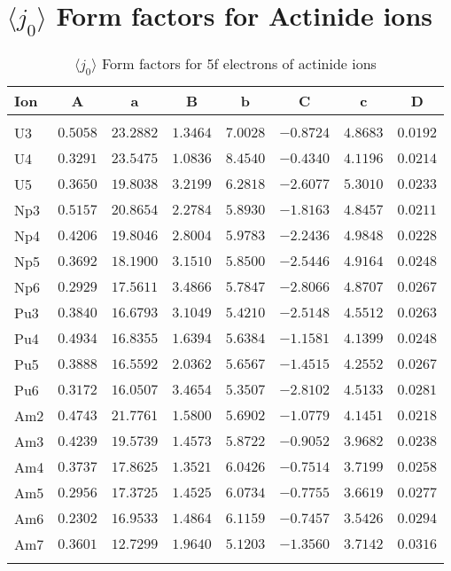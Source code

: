 \section{{\large$\langle j_0\rangle$ }Form factors for Actinide ions}
\begin{table}[H]
\caption{$\langle j_0\rangle$ Form factors for 5f electrons of actinide ions}\vspace{2mm}
\label{acj0}
{\tablesize
\begin{tabular}{lrrrrrrr}
\hline
Ion&
\multicolumn{1}{c}{A}&\multicolumn{1}{c}{a}&
\multicolumn{1}{c}{B}&\multicolumn{1}{c}{b}&
\multicolumn{1}{c}{C}&\multicolumn{1}{c}{c}&\multicolumn{1}{c}{D}\\
\hline\\[-2ex]
U3 &$0.5058$ &$23.2882$ &$1.3464$ &$7.0028$ &$-0.8724$ &$4.8683$ &$0.0192$ \\
U4 &$0.3291$ &$23.5475$ &$1.0836$ &$8.4540$ &$-0.4340$ &$4.1196$ &$0.0214$ \\
U5 &$0.3650$ &$19.8038$ &$3.2199$ &$6.2818$ &$-2.6077$ &$5.3010$ &$0.0233$ \\
Np3 &$0.5157$ &$20.8654$ &$2.2784$ &$5.8930$ &$-1.8163$ &$4.8457$ &$0.0211$ \\
Np4 &$0.4206$ &$19.8046$ &$2.8004$ &$5.9783$ &$-2.2436$ &$4.9848$ &$0.0228$ \\
Np5 &$0.3692$ &$18.1900$ &$3.1510$ &$5.8500$ &$-2.5446$ &$4.9164$ &$0.0248$ \\
Np6 &$0.2929$ &$17.5611$ &$3.4866$ &$5.7847$ &$-2.8066$ &$4.8707$ &$0.0267$ \\
Pu3 &$0.3840$ &$16.6793$ &$3.1049$ &$5.4210$ &$-2.5148$ &$4.5512$ &$0.0263$ \\
Pu4 &$0.4934$ &$16.8355$ &$1.6394$ &$5.6384$ &$-1.1581$ &$4.1399$ &$0.0248$ \\
Pu5 &$0.3888$ &$16.5592$ &$2.0362$ &$5.6567$ &$-1.4515$ &$4.2552$ &$0.0267$ \\
Pu6 &$0.3172$ &$16.0507$ &$3.4654$ &$5.3507$ &$-2.8102$ &$4.5133$ &$0.0281$ \\
Am2 &$0.4743$ &$21.7761$ &$1.5800$ &$5.6902$ &$-1.0779$ &$4.1451$ &$0.0218$ \\
Am3 &$0.4239$ &$19.5739$ &$1.4573$ &$5.8722$ &$-0.9052$ &$3.9682$ &$0.0238$ \\
Am4 &$0.3737$ &$17.8625$ &$1.3521$ &$6.0426$ &$-0.7514$ &$3.7199$ &$0.0258$ \\
Am5 &$0.2956$ &$17.3725$ &$1.4525$ &$6.0734$ &$-0.7755$ &$3.6619$ &$0.0277$ \\
Am6 &$0.2302$ &$16.9533$ &$1.4864$ &$6.1159$ &$-0.7457$ &$3.5426$ &$0.0294$ \\
Am7 &$0.3601$ &$12.7299$ &$1.9640$ &$5.1203$ &$-1.3560$ &$3.7142$ &$0.0316$ \\
\hline\\[-2ex]
\end{tabular}
}
\end{table}
